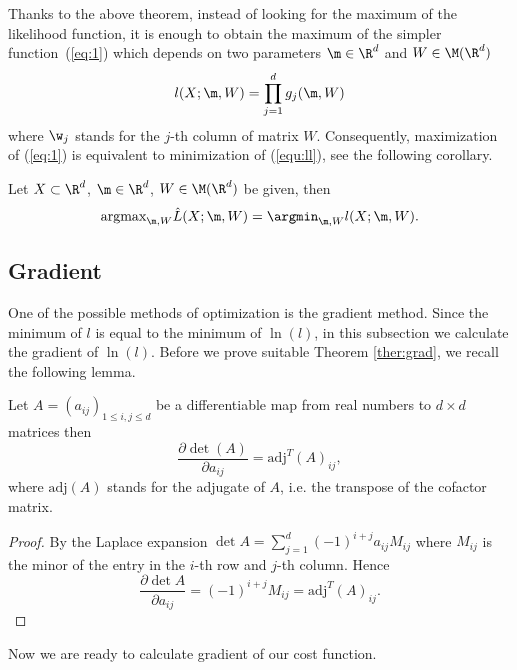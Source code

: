 Thanks to the above theorem, instead of looking for the maximum of the likelihood function, it is enough to obtain the maximum of the simpler function~(\ref{eq:1}) which depends on two parameters $\m \in \R^d$ and $W \in \M(\R^d)$
\begin{equation}\label{equ:ll}
{l}(X;\m,W) = \prod_{j=1}^{d} {g}_{j}(\m,W)
\end{equation}
where $\w_{j}$ stands for the $j$-th column of matrix $W$. 
Consequently, maximization of (\ref{eq:1}) is equivalent to minimization of  (\ref{equ:ll}), see the following corollary.

\begin{corollary}\label{c2}
Let $X \subset \R^d$, $\m \in \R^d$, $W \in \M(\R^d)$ be given, then
$$
 \text{argmax}_{\m,W} \hat{L}(X;\m,W) =  \argmin_{\m,W} {l}(X;\m,W).
$$
\end{corollary}
%


\subsection{Gradient}



One of the possible methods of optimization is the gradient method. Since the minimum of ${l}$ is equal to the minimum of $\ln({l})$, in this subsection we calculate the gradient of $\ln({l})$. 
Before we prove suitable Theorem \ref{ther:grad}, we recall the following lemma. 

\begin{lemma}\label{jacobi}
Let $A = (a_{ij})_{1 \leq i,j \leq d}$ be a differentiable map from real numbers to $d \times d$ matrices then
\begin{equation}
\frac{\partial \det(A)}{\partial a_{ij}} = \mathrm{adj}^T(A)_{ij},
\end{equation}
where $\mathrm{adj}(A)$ stands for the adjugate of $A$, i.e. the transpose of the cofactor matrix.
\end{lemma}
\begin{proof}
By the Laplace expansion $\det A = \sum\limits_{j=1}^{d} (-1)^{i+j} a_{ij} M_{ij}$ where $M_{ij}$ is the minor of the entry in the $i$-th row and $j$-th column. Hence
$$\frac{\partial \det A}{\partial a_{ij}} = (-1)^{i+j} M_{ij} = \mathrm{adj}^T(A)_{ij}.$$
\end{proof}
Now we are ready to calculate gradient of our cost function.


